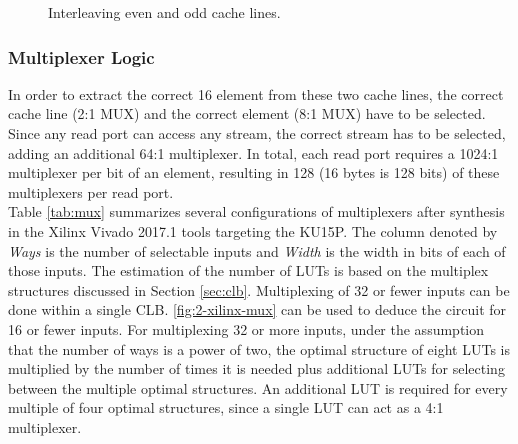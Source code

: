 \begin{figure}[htb!]
  {\caption{Interleaving even and odd cache lines.}\label{fig:3-interleave}}
\end{figure}



\subsubsection{Multiplexer Logic}
In order to extract the correct \SI{16}{\byte} element from these two cache lines, the correct cache line (2:1 MUX) and the correct element (8:1 MUX) have to be selected. Since any read port can access any stream, the correct stream has to be selected, adding an additional 64:1 multiplexer. In total, each read port requires a 1024:1 multiplexer per bit of an element, resulting in 128 (16 bytes is 128 bits) of these multiplexers per read port.\\
Table \ref{tab:mux} summarizes several configurations of multiplexers after synthesis in the Xilinx Vivado 2017.1 tools targeting the KU15P. The column denoted by \textit{Ways} is the number of selectable inputs and \textit{Width} is the width in bits of each of those inputs. The estimation of the number of LUTs is based on the multiplex structures discussed in Section \ref{sec:clb}. Multiplexing of 32 or fewer inputs can be done within a single CLB. \autoref{fig:2-xilinx-mux} can be used to deduce the circuit for 16 or fewer inputs. For multiplexing 32 or more inputs, under the assumption that the number of ways is a power of two, the optimal structure of eight LUTs is multiplied by the number of times it is needed plus additional LUTs for selecting between the multiple optimal structures. An additional LUT is required for every multiple of four optimal structures, since a single LUT can act as a 4:1 multiplexer.

